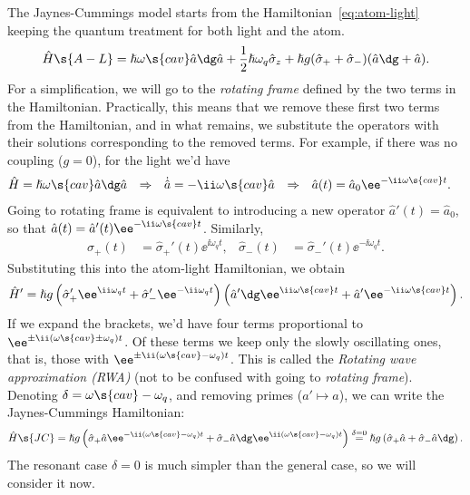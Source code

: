 \documentclass[fontsize=9pt,bookmarkpackage=false]{scrartcl}
\renewcommand{\hbar}{\hslash}
\begin{document}
The Jaynes-Cummings model starts from the Hamiltonian~\cref{eq:atom-light} keeping the quantum treatment for both light and the atom.
\begin{equation}
  \hat H\s{A-L} = \hbar \omega\s{cav} \hat a\dg \hat a
  + \frac 12 \hbar \omega_q \hat \sigma_z
  + \hbar g ( \hat \sigma_+ + \hat \sigma_- ) ( \hat a \dg + \hat a ).
\end{equation}
For a simplification, we will go to the \emph{rotating frame} defined by the two terms in the Hamiltonian.
Practically, this means that we remove these first two terms from the Hamiltonian, and in what remains, we substitute the operators with their solutions corresponding to the removed terms.
For example, if there was no coupling ($g = 0$), for the light we'd have
\begin{align}
  \hat H & = \hbar \omega\s{cav} \hat a \dg \hat a
  & \Rightarrow &&
  \dot{ \hat a } & = - \ii \omega\s{cav} \hat a
  & \Rightarrow &&
  \hat a (t) & = \hat a_0 \ee^ { - \ii \omega\s{cav} t }.
\end{align}
Going to rotating frame is equivalent to introducing a new operator  $\hat a'(t) = \hat a_0$, so that $\hat a (t) = \hat a'(t) \ee^{ - \ii \omega\s{cav} t }$.
Similarly,
\begin{align}
  \hat \sigma_+ (t) & = \hat \sigma_+' (t) \ee^{ \ii \omega_q t },
  &
  \hat \sigma_- (t) & = \hat \sigma_-' (t) \ee^{ - \ii \omega_q t }.
\end{align}
Substituting this into the atom-light Hamiltonian, we obtain
\begin{equation}
  \hat H' = \hbar g 
  \left( \hat \sigma_+' \ee^{ \ii \omega_ q t } + \hat \sigma_-' \ee^{ - \ii \omega_q t } \right)
  \left( \hat a'{} \dg \ee^{ \ii \omega\s{cav} t } + \hat a' \ee^{ - \ii \omega\s{cav} t }  \right).
\end{equation}
If we expand the brackets, we'd have four terms proportional to $\ee^{ \pm \ii ( \omega\s{cav} \pm \omega_q ) t }$.
Of these terms we keep only the slowly oscillating ones, that is, those with $\ee^{ \pm \ii (\omega\s{cav} - \omega_q ) t }$.
This is called the \emph{Rotating wave approximation (RWA)} (not to be confused with going to \emph{rotating frame}).
Denoting $\delta = \omega\s{cav} - \omega_q$, and removing primes ($a' \mapsto a$), we can write the Jaynes-Cummings Hamiltonian:
\begin{equation}
  \hat H\s{JC} = \hbar g
  \left(
  \hat \sigma_+ \hat a \ee^{ - \ii ( \omega\s{cav} - \omega_q ) t }
  +
  \hat \sigma_- \hat a\dg \ee^{ \ii ( \omega\s{cav} - \omega_q ) t }
  \right)
  \stackrel{ \delta = 0 }{=}
  \hbar g \left( \hat \sigma_+ \hat a + \hat \sigma_- \hat a\dg \right).
\end{equation}
The resonant case $\delta = 0$ is much simpler than the general case, so we will consider it now.
\end{document}
